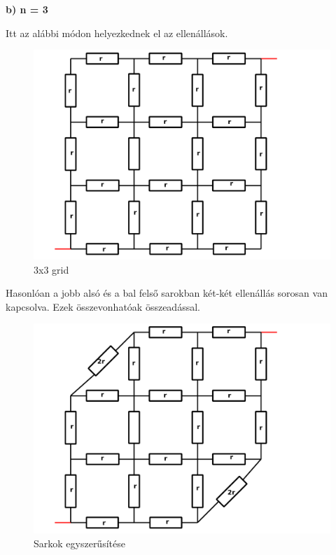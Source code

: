 \documentclass[11pt,a4paper,openany,leqno]{article}
\begin{document}
\newpage
\textbf{b) n = 3}

Itt az alábbi módon helyezkednek el az ellenállások.\\

\begin{figure}[h!]
\centering
  \includegraphics[width=150mm,scale=0.5]{grid_3_1.pdf}
  \caption{3x3 grid}
  \label{}
\end{figure}
 \newpage
Hasonlóan a jobb alsó és a bal felső sarokban két-két ellenállás sorosan van kapcsolva. Ezek összevonhatóak összeadással.\\

\begin{figure}[h!]
\centering
  \includegraphics[width=150mm,scale=0.5]{grid_3_2.pdf}
  \caption{Sarkok egyszerűsítése}
  \label{}
\end{figure}
\newpage
\end{document}
